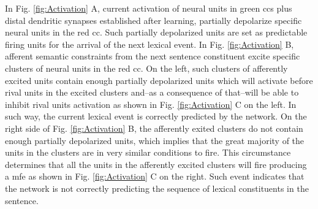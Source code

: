 {In Fig. \ref{fig:Activation} A, current activation of neural units in green \glspl{cc} plus distal dendritic synapses established after learning, partially depolarize specific neural units in the red \gls{cc}. Such partially depolarized units are set as predictable firing units for the arrival of the next lexical event. In Fig. \ref{fig:Activation} B, afferent semantic constraints from the next sentence constituent excite specific clusters of neural units in the red \gls{cc}. On the left, such clusters of afferently excited units contain enough partially depolarized units which will activate before rival units in the excited clusters and--as a consequence of that--will be able to inhibit rival units activation as shown in Fig. \ref{fig:Activation} C on the left. In such way, the current lexical event is correctly predicted by the network. On the right side of Fig. \ref{fig:Activation} B, the afferently exited clusters do not contain enough partially depolarized units, which implies that the great majority of the units in the clusters are in very similar conditions to fire. This circumstance determines that all the units in the afferently excited clusters will fire producing a \gls{mfe} as shown in Fig. \ref{fig:Activation} C on the right. Such event indicates that the network is not correctly predicting the sequence of lexical constituents in the sentence.
}
























